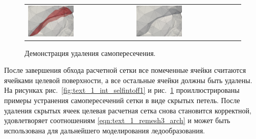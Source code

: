 \begin{figure}[h]
\centering
\begin{tabular}{ll}
\includegraphics[width=0.45\textwidth]{./pics/text_1_int/pic_self_intersection_on_2.png}
&
\includegraphics[width=0.45\textwidth]{./pics/text_1_int/pic_self_intersection_off_2.png}
\end{tabular}
\caption{Демонстрация удаления самопересечения.}
\label{fig:text_1_int_selfintoff2}
\end{figure}

После завершения обхода расчетной сетки все помеченные ячейки считаются ячейками целевой поверхности, а все остальные ячейки должны быть удалены.
На рисунках рис.~\ref{fig:text_1_int_selfintoff1} и рис.~\ref{fig:text_1_int_selfintoff2} проиллюстрированы примеры устранения самопересечений сетки в виде скрытых петель.
После удаления скрытых ячеек целевая расчетная сетка снова становится корректной, удовлетворяет соотношениям \eqref{eqn:text_1_remesh3_arch} и может быть использована для дальнейшего моделирования ледообразования.

